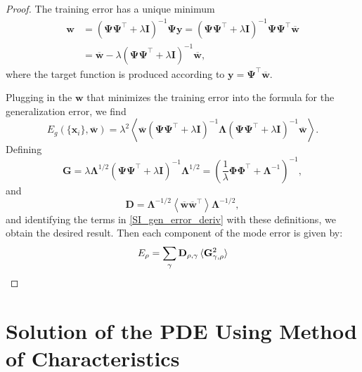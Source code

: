 \documentclass{article}
\begin{document}
\begin{proof}
The training error has a unique minimum
\begin{align}
    \mathbf{w} &= (\mathbf{\Psi} \mathbf{\Psi}^\top +\lambda \mathbf{I})^{-1} \mathbf{\Psi} \mathbf{y} = (\mathbf{\Psi} \mathbf{\Psi}^\top +\lambda \mathbf{I})^{-1} \mathbf{\Psi} \mathbf{\Psi}^\top \mathbf{\overline{w}}
    \nonumber \\
    &= \mathbf{\overline{w}} - \lambda (\mathbf{\Psi} \mathbf{\Psi}^\top +\lambda \mathbf{I})^{-1} \mathbf{\overline{w}},
\end{align}
%
where the target function is produced according to $\mathbf{y} = \mathbf{\Psi}^\top \mathbf{\overline{w}}$.

Plugging in the $\mathbf{w}$ that minimizes the training error into the formula for the generalization error, we find 
\begin{equation}\label{SI_gen_error_deriv}
    E_g(\{\mathbf{x}_i\}, \mathbf{\overline{w}}) = \lambda^2 \left< \mathbf{\overline{w}} (\mathbf{\Psi} \mathbf{\Psi}^\top +\lambda \mathbf{I})^{-1} \mathbf{\Lambda} (\mathbf{\Psi} \mathbf{\Psi}^\top +\lambda \mathbf{I})^{-1} \mathbf{\overline{w}}  \right>.
\end{equation}
%
Defining 
\begin{equation}
    \mathbf{G} = \lambda \mathbf{\Lambda}^{1/2} (\mathbf{\Psi} \mathbf{\Psi}^\top +\lambda \mathbf{I})^{-1} \mathbf{\Lambda}^{1/2} =  \left( \frac{1}{\lambda} \mathbf{\Phi} \mathbf{\Phi}^\top + \mathbf{\Lambda}^{-1}  \right)^{-1},
\end{equation}
and 
\begin{equation}
    \mathbf{D} = \mathbf{\Lambda}^{-1/2} \left< \mathbf{\overline{w}} \mathbf{\overline{w}}^\top \right> \mathbf{\Lambda}^{-1/2},
\end{equation}
and identifying the terms in \eqref{SI_gen_error_deriv} with these definitions, we obtain the desired result. Then each component of the mode error is given by:
\begin{equation}
    E_\rho = \sum_\gamma \mathbf{D}_{\rho,\gamma} \braket{\mathbf{G
    }^2_{\gamma,\rho}}
\end{equation}
\end{proof}

\section{Solution of the PDE Using Method of Characteristics}\label{SISolutionPDE}
\end{document}
